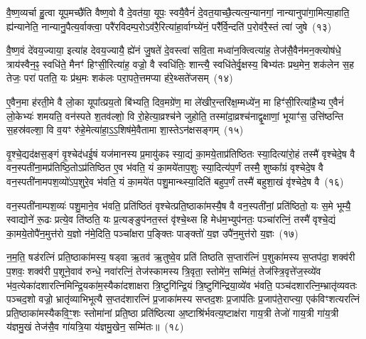 {\anuvakamend[{अथ॑ ददते॒ स्वया॒ सन्थ्स्व॑धाका॒रो हि वि॑न्दति}]}%

वै॒ष्ण॒व्यर्चा हु॒त्वा यूप॒मच्छै॑ति वैष्ण॒वो वै दे॒वत॑या॒ यूपः॒ स्वयै॒वैनं॑ दे॒वत॒याच्छै॒त्यत्य॒न्यानगां॒ नान्यानुपा॑गा॒मित्या॒हाति॒ ह्य॑न्यानेति॒ नान्यानु॒पैत्य॒र्वाक्त्वा॒ परै॑रविदम्प॒रो\-ऽव॑रै॒रित्या॑हा॒र्वाग्घ्ये॑नं॒ परै᳚र्वि॒न्दति॑ प॒रोव॑रै॒स्तं त्वा॑ जुषे~(१३)

वै॒ष्ण॒वं दे॑वय॒ज्याया॒ इत्या॑ह देवय॒ज्यायै॒ ह्ये॑नं जु॒षते॑ दे॒वस्त्वा॑ सवि॒ता मध्वा॑न॒क्त्वित्या॑ह॒ तेज॑सै॒वैन॑मन॒क्त्योष॑धे॒ त्राय॑स्वैन॒ꣴ॒ स्वधि॑ते॒ मैनꣳ॑ हिꣳसी॒रित्या॑ह॒ वज्रो॒ वै स्वधि॑तिः॒ शान्त्यै॒ स्वधि॑तेर्वृ॒क्षस्य॒ बिभ्य॑तः प्रथ॒मेन॒ शक॑लेन स॒ह तेजः॒ परा॑ पतति॒ यः प्र॑थ॒मः शक॑लः परा॒पते॒त्तमप्या ह॑रे॒थ्सते॑जसम्~(१४)

ए॒वैन॒मा ह॑रती॒मे वै लो॒का यूपा᳚त्प्रय॒तो बि॑भ्यति॒ दिव॒मग्रे॑ण॒ मा ले॑खीर॒न्तरि॑क्ष॒म्मध्ये॑न॒ मा हिꣳ॑सी॒रित्या॑है॒भ्य ए॒वैनं॑ लो॒केभ्यः॑ शमयति॒ वन॑स्पते श॒तव॑ल्\mbox{}शो॒ वि रो॒हेत्या॒व्रश्च॑ने जुहोति॒ तस्मा॑दा॒व्रश्च॑नाद्वृ॒क्षाणां॒ भूयाꣳ॑स॒ उत्ति॑ष्ठन्ति स॒हस्र॑वल्\mbox{}शा॒ वि व॒यꣳ रु॑हे॒मेत्या॑हा॒ऽ॒ऽ॒शिष॑मे॒वैतामा शा॒स्ते\-ऽन॑क्षसङ्गम्~(१५)

वृ॒श्चे॒द्यद॑क्षस॒ङ्गं वृ॒श्चेद॑धई॒षं यज॑मानस्य प्र॒मायु॑कꣴ स्या॒द्यं का॒मये॒ताप्र॑तिष्ठितः स्या॒दित्या॑रो॒हं तस्मै॑ वृश्चेदे॒ष वै वन॒स्पती॑ना॒मप्र॑तिष्ठि॒तो\-ऽप्र॑तिष्ठित ए॒व भ॑वति॒ यं का॒मये॑ताप॒शुः स्या॒दित्य॑प॒र्णं तस्मै॒ शुष्का᳚ग्रं वृश्चेदे॒ष वै वन॒स्पती॑नामपश॒व्यो॑\-ऽप॒शुरे॒व भ॑वति॒ यं का॒मये॑त पशु॒मान्थ्स्या॒दिति॑ बहुप॒र्णं तस्मै॑ बहुशा॒खं वृ॑श्चेदे॒ष वै~(१६)

वन॒स्पती॑नाम्पश॒व्यः॑ पशु॒माने॒व भ॑वति॒ प्रति॑ष्ठितं वृश्चेत्प्रति॒ष्ठाका॑मस्यै॒ष वै वन॒स्पती॑नां॒ प्रति॑ष्ठितो॒ यः स॒मे भूम्यै॒ स्वाद्योने॑ रू॒ढः प्रत्ये॒व ति॑ष्ठति॒ यः प्र॒त्यङ्ङुप॑नत॒स्तं वृ॑श्चे॒थ्स हि मेध॑म॒भ्युप॑नतः॒ पञ्चा॑रत्निं॒ तस्मै॑ वृश्चे॒द्यं का॒मये॒तोपै॑न॒मुत्त॑रो य॒ज्ञो न॑मे॒दिति॒ पञ्चा᳚क्षरा प॒ङ्क्तिः पाङ्क्तो॑ य॒ज्ञ उपै॑न॒मुत्त॑रो य॒ज्ञः~(१७)

न॒म॒ति॒ षड॑रत्निं प्रति॒ष्ठाका॑मस्य॒ षड्वा ऋ॒तव॑ ऋ॒तुष्वे॒व प्रति॑ तिष्ठति स॒प्तार॑त्निं प॒शुका॑मस्य स॒प्तप॑दा॒ शक्व॑री प॒शवः॒ शक्व॑री प॒शूने॒वाव॑ रुन्धे॒ नवा॑रत्निं॒ तेज॑स्कामस्य त्रि॒वृता॒ स्तोमे॑न॒ सम्मि॑तं॒ तेज॑स्त्रि॒वृत्ते॑ज॒स्व्ये॑व भ॑व॒त्येका॑\-दशारत्नि\-मिन्द्रि॒यका॑म॒स्यैका॑\-दशाक्षरा त्रि॒ष्टुगि॑न्द्रि॒यं त्रि॒ष्टुगि॑न्द्रिया॒व्ये॑व भ॑वति॒ पञ्च॑दशारत्नि॒म्भ्रातृ॑व्यवतः पञ्चद॒शो वज्रो॒ भ्रातृ॑व्याभिभूत्यै स॒प्तद॑शारत्निं प्र॒जाका॑मस्य सप्तद॒शः प्र॒जा\-प॑तिः प्र॒जाप॑ते॒राप्त्या॒ एक॑विꣳशत्यरत्निं प्रति॒ष्ठाका॑मस्यैक\-वि॒ꣳ॒शः स्तोमा॑नां प्रति॒ष्ठा प्रति॑ष्ठित्या अ॒ष्टाश्रि॑र्भवत्य॒ष्टाक्ष॑रा गाय॒त्री तेजो॑ गाय॒त्री गा॑य॒त्री य॑ज्ञमु॒खं तेज॑सै॒व गा॑यत्रि॒या य॑ज्ञमु॒खेन॒ सम्मि॑तः॥~(१८)

